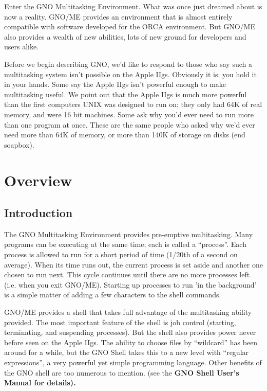 \documentclass{report}
\begin{document}
Enter the GNO Multitasking Environment.
What was once just dreamed about is now a reality. GNO/ME
provides an environment that is almost entirely compatible with
software developed for the ORCA environment. But GNO/ME also
provides a wealth of new abilities, lots of new ground for
developers and users alike.

Before we begin describing GNO, we'd like to
respond to those who say such a multitasking system isn't
possible on the Apple IIgs. Obviously it is: you hold it in your
hands. Some say the Apple IIgs isn't powerful enough to make
multitasking useful. We point out that the Apple IIgs is much
more powerful than the first computers UNIX was designed to run
on; they only had 64K of real memory, and were 16 bit machines.
Some ask why you'd ever need to run more than one program at
once. These are the same people who asked why we'd ever need more
than 64K of memory, or more than 140K of storage on disks (end
soapbox).

\chapter{Overview}

\section{Introduction}

The GNO Multitasking Environment provides
pre-emptive multitasking. Many programs can be executing at the
same time; each is called a ``process''. Each process is allowed to
run for a short period of time (1/20th of a second on average).
When its time runs out, the current process is set aside and
another one chosen to run next. This cycle continues until there
are no more processes left (i.e. when you exit GNO/ME). Starting
up processes to run 'in the background' is a simple matter of
adding a few characters to the shell commands.

GNO/ME provides a shell that takes full
advantage of the multitasking ability provided. The most
important feature of the shell is job control (starting,
terminating, and suspending processes). But the shell also
provides power never before seen on the Apple IIgs. The ability
to choose files by ``wildcard'' has been around for a while, but
the GNO Shell takes this to a new level with ``regular
expressions'', a very powerful yet simple programming language.
Other benefits of the GNO shell are too numerous to mention. (see
the \bf GNO Shell User's Manual \rm  for details).
\end{document}
